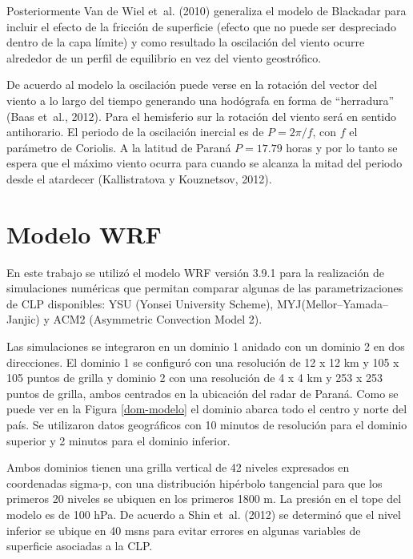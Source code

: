 \documentclass[12pt,spanish,oneside, a4paper]{book}
\begin{document}
Posteriormente Van de Wiel et~al. (2010) generaliza el modelo de
Blackadar para incluir el efecto de la fricción de superficie (efecto
que no puede ser despreciado dentro de la capa límite) y como resultado
la oscilación del viento ocurre alrededor de un perfil de equilibrio en
vez del viento geostrófico.

De acuerdo al modelo la oscilación puede verse en la rotación del vector
del viento a lo largo del tiempo generando una hodógrafa en forma de
``herradura'' (Baas et~al., 2012). Para el hemisferio sur la rotación
del viento será en sentido antihorario. El periodo de la oscilación
inercial es de \(P = 2\pi/f\), con \(f\) el parámetro de Coriolis. A la
latitud de Paraná \(P = 17.79\) horas y por lo tanto se espera que el
máximo viento ocurra para cuando se alcanza la mitad del periodo desde
el atardecer (Kallistratova y Kouznetsov, 2012).

\section{Modelo WRF}\label{modelo-wrf}

En este trabajo se utilizó el modelo WRF versión 3.9.1 para la
realización de simulaciones numéricas que permitan comparar algunas de
las parametrizaciones de CLP disponibles: YSU (Yonsei University
Scheme), MYJ(Mellor--Yamada--Janjic) y ACM2 (Asymmetric Convection Model
2).

Las simulaciones se integraron en un dominio 1 anidado con un dominio 2
en dos direcciones. El dominio 1 se configuró con una resolución de 12 x
12 km y 105 x 105 puntos de grilla y dominio 2 con una resolución de 4 x
4 km y 253 x 253 puntos de grilla, ambos centrados en la ubicación del
radar de Paraná. Como se puede ver en la Figura \ref{dom-modelo} el
dominio abarca todo el centro y norte del país. Se utilizaron datos
geográficos con 10 minutos de resolución para el dominio superior y 2
minutos para el dominio inferior.

Ambos dominios tienen una grilla vertical de 42 niveles expresados en
coordenadas sigma-p, con una distribución hipérbolo tangencial para que
los primeros 20 niveles se ubiquen en los primeros 1800 m. La presión en
el tope del modelo es de 100 hPa. De acuerdo a Shin et~al. (2012) se
determinó que el nivel inferior se ubique en 40 msns para evitar errores
en algunas variables de superficie asociadas a la CLP.
\end{document}
